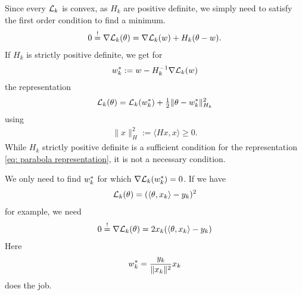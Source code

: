 Since every \(\mathcal{L}_k\) is convex, as \(H_k\) are positive definite, we
simply need to satisfy the first order condition to find a minimum.
\begin{align*}
	0\overset!= \nabla\mathcal{L}_k(\theta)
	= \nabla\mathcal{L}_k(w) + H_k(\theta-w).
\end{align*}
If \(H_k\) is strictly positive definite, we get for
\begin{align*}
	w^*_k := w - H_k^{-1}\nabla\mathcal{L}_k(w)
\end{align*}
the representation
\begin{align}\label{eq: parabola representation}
	\mathcal{L}_k(\theta) = \mathcal{L}_k(w^*_k) + \tfrac12 \|\theta-w^*_k\|_{H_k}^2
\end{align}
using
\begin{align*}
	\|x\|_H^2 := \langle Hx, x\rangle\ge 0.
\end{align*}
While \(H_k\) strictly positive definite is a sufficient condition for the
representation \eqref{eq: parabola representation}, it is not a necessary
condition.
\begin{example}
	We only need to find \(w^*_k\) for which \(\nabla\mathcal{L}_k(w^*_k)=0\).
	If we have
	\begin{align*}
		\mathcal{L}_k(\theta) = (\langle \theta, x_k\rangle - y_k)^2
	\end{align*}	
	for example, we need
	\begin{align*}
		0\overset!=\nabla\mathcal{L}_k(\theta) = 2x_k (\langle \theta, x_k\rangle - y_k)
	\end{align*}
	Here
	\begin{align*}
		w^*_k = \frac{y_k}{\|x_k\|^2}x_k
	\end{align*}
	does the job.
\end{example}

